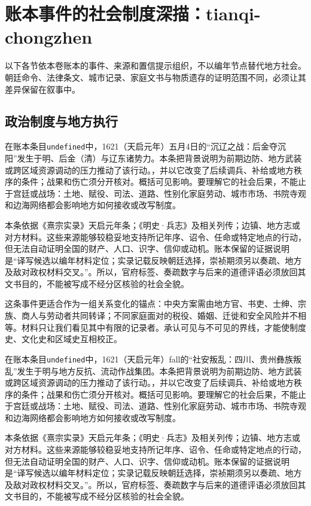 \section{账本事件的社会制度深描：tianqi-chongzhen}

\label{sec:ledger-depth-tianqi-chongzhen}

以下各节依本卷账本的事件、来源和置信提示组织，不以编年节点替代地方社会。朝廷命令、法律条文、城市记录、家庭文书与物质遗存的证明范围不同，必须让其差异保留在叙事中。

\subsection{政治制度与地方执行}

在账本条目\texttt{undefined}中，1621（天启元年）五月4日的“沉辽之战：后金夺沉阳”发生于明、后金（清）与辽东诸势力。本条把背景说明为前期边防、地方武装或跨区域资源调动的压力推动了该行动。，并以它改变了后续调兵、补给或地方秩序的条件；战果和伤亡须分开核对。概括可见影响。要理解它的社会后果，不能止于宫廷或战场：土地、赋役、司法、道路、性别化家庭劳动、城市市场、书院寺观和边海网络都会影响地方如何接收或改写制度。

本条依据《熹宗实录》天启元年条；《明史·兵志》及相关列传；边镇、地方志或对方材料。这些来源能够较稳妥地支持所记年序、诏令、任命或特定地点的行动，但无法自动证明全国的财产、人口、识字、信仰或动机。账本保留的证据说明是“译写候选以编年材料定位；实录记载反映朝廷选择，崇祯期须另以奏疏、地方及敌对政权材料交叉。”。所以，官府标签、奏疏数字与后来的道德评语必须放回其文书目的，不能被写成不经分区核验的社会全貌。

这条事件更适合作为一组关系变化的锚点：中央方案需由地方官、书吏、士绅、宗族、商人与劳动者共同转译；不同家庭面对的税役、婚姻、迁徙和安全风险并不相等。材料只让我们看见其中有限的记录者。承认可见与不可见的界线，才能使制度史、文化史和区域史互相校正。

在账本条目\texttt{undefined}中，1621（天启元年）fall的“社安叛乱：四川、贵州彝族叛乱”发生于明与地方反抗、流动作战集团。本条把背景说明为前期边防、地方武装或跨区域资源调动的压力推动了该行动。，并以它改变了后续调兵、补给或地方秩序的条件；战果和伤亡须分开核对。概括可见影响。要理解它的社会后果，不能止于宫廷或战场：土地、赋役、司法、道路、性别化家庭劳动、城市市场、书院寺观和边海网络都会影响地方如何接收或改写制度。

本条依据《熹宗实录》天启元年条；《明史·兵志》及相关列传；边镇、地方志或对方材料。这些来源能够较稳妥地支持所记年序、诏令、任命或特定地点的行动，但无法自动证明全国的财产、人口、识字、信仰或动机。账本保留的证据说明是“译写候选以编年材料定位；实录记载反映朝廷选择，崇祯期须另以奏疏、地方及敌对政权材料交叉。”。所以，官府标签、奏疏数字与后来的道德评语必须放回其文书目的，不能被写成不经分区核验的社会全貌。

